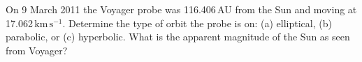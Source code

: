 On 9 March 2011 the Voyager probe was 116.406\,AU from the Sun and moving at
17.062\,$\mathrm{km\,s^{-1}}$. Determine the type of orbit the probe is on:
(a) elliptical, (b) parabolic, or (c) hyperbolic. What is the apparent
magnitude of the Sun as seen from Voyager?
